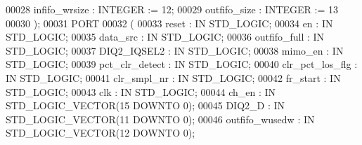 \begin{DoxyCode}
00028         \textcolor{vhdlchar}{infifo_wrsize} \textcolor{vhdlchar}{:} \textcolor{comment}{INTEGER} \textcolor{vhdlchar}{:=} \textcolor{vhdllogic}{}\textcolor{vhdllogic}{12};
00029         \textcolor{vhdlchar}{outfifo_size} \textcolor{vhdlchar}{:} \textcolor{comment}{INTEGER} \textcolor{vhdlchar}{:=} \textcolor{vhdllogic}{}\textcolor{vhdllogic}{13}
00030         \textcolor{vhdlchar}{)};
00031     \textcolor{keywordflow}{PORT}
00032     \textcolor{vhdlchar}{(}
00033         \textcolor{vhdlchar}{reset} \textcolor{vhdlchar}{:}  \textcolor{keywordflow}{IN}  \textcolor{comment}{STD\_LOGIC};
00034         \textcolor{vhdlchar}{en} \textcolor{vhdlchar}{:}  \textcolor{keywordflow}{IN}  \textcolor{comment}{STD\_LOGIC};
00035         \textcolor{vhdlchar}{data_src} \textcolor{vhdlchar}{:}  \textcolor{keywordflow}{IN}  \textcolor{comment}{STD\_LOGIC};
00036         \textcolor{vhdlchar}{outfifo_full} \textcolor{vhdlchar}{:}  \textcolor{keywordflow}{IN}  \textcolor{comment}{STD\_LOGIC};
00037         \textcolor{vhdlchar}{DIQ2_IQSEL2} \textcolor{vhdlchar}{:}  \textcolor{keywordflow}{IN}  \textcolor{comment}{STD\_LOGIC};
00038         \textcolor{vhdlchar}{mimo_en} \textcolor{vhdlchar}{:}  \textcolor{keywordflow}{IN}  \textcolor{comment}{STD\_LOGIC};
00039         \textcolor{vhdlchar}{pct_clr_detect} \textcolor{vhdlchar}{:}  \textcolor{keywordflow}{IN}  \textcolor{comment}{STD\_LOGIC};
00040         \textcolor{vhdlchar}{clr_pct_los_flg} \textcolor{vhdlchar}{:}  \textcolor{keywordflow}{IN}  \textcolor{comment}{STD\_LOGIC};
00041         \textcolor{vhdlchar}{clr_smpl_nr} \textcolor{vhdlchar}{:}  \textcolor{keywordflow}{IN}  \textcolor{comment}{STD\_LOGIC};
00042         \textcolor{vhdlchar}{fr_start} \textcolor{vhdlchar}{:}  \textcolor{keywordflow}{IN}  \textcolor{comment}{STD\_LOGIC};
00043         \textcolor{vhdlchar}{clk} \textcolor{vhdlchar}{:}  \textcolor{keywordflow}{IN}  \textcolor{comment}{STD\_LOGIC};
00044         \textcolor{vhdlchar}{ch_en} \textcolor{vhdlchar}{:}  \textcolor{keywordflow}{IN}  \textcolor{comment}{STD\_LOGIC\_VECTOR}\textcolor{vhdlchar}{(}\textcolor{vhdllogic}{}\textcolor{vhdllogic}{15} \textcolor{keywordflow}{DOWNTO} \textcolor{vhdllogic}{}\textcolor{vhdllogic}{0}\textcolor{vhdlchar}{)};
00045         \textcolor{vhdlchar}{DIQ2_D} \textcolor{vhdlchar}{:}  \textcolor{keywordflow}{IN}  \textcolor{comment}{STD\_LOGIC\_VECTOR}\textcolor{vhdlchar}{(}\textcolor{vhdllogic}{}\textcolor{vhdllogic}{11} \textcolor{keywordflow}{DOWNTO} \textcolor{vhdllogic}{}\textcolor{vhdllogic}{0}\textcolor{vhdlchar}{)};
00046         \textcolor{vhdlchar}{outfifo_wusedw} \textcolor{vhdlchar}{:}  \textcolor{keywordflow}{IN}  \textcolor{comment}{STD\_LOGIC\_VECTOR}\textcolor{vhdlchar}{(}\textcolor{vhdllogic}{}\textcolor{vhdllogic}{12} \textcolor{keywordflow}{DOWNTO} \textcolor{vhdllogic}{}\textcolor{vhdllogic}{0}\textcolor{vhdlchar}{)};

\end{DoxyCode}
